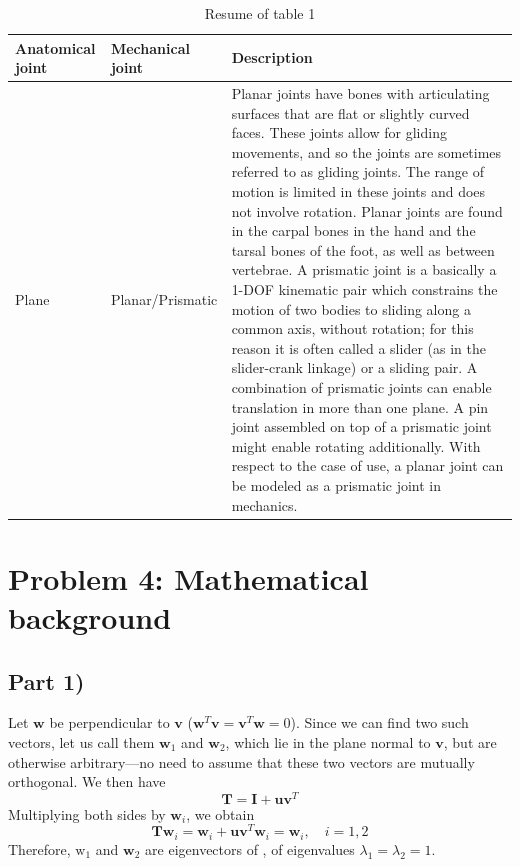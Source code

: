 \documentclass[conference]{IEEEtran}
\begin{document}
{\begin{table}[htbp]
    \caption{Resume of table 1}
    \centering
    \begin{tabular}{|Y|Y|m{120px}|}
        \hline
        Anatomical joint & Mechanical joint & Description \\
        \hline
        Plane & Planar/Prismatic & Planar joints have bones with articulating surfaces that are flat or slightly curved faces. These joints allow for gliding movements, and so the joints are sometimes referred to as gliding joints. The range of motion is limited in these joints and does not involve rotation. Planar joints are found in the carpal bones in the hand and the tarsal bones of the foot, as well as between vertebrae. A prismatic joint is a basically a 1-DOF kinematic pair which constrains the motion of two bodies to sliding along a common axis, without rotation; for this reason it is often called a slider (as in the slider-crank linkage) or a sliding pair. A combination of prismatic joints can enable translation in more than one plane. A pin joint assembled on top of a prismatic joint might enable rotating additionally. With respect to the case of use, a planar joint can be modeled as a prismatic joint in mechanics.\\
        \hline
    \end{tabular}
    \label{tab:table_two}
\end{table}
}

\vspace{10px}
\section{Problem 4: Mathematical background}
\subsection*{Part 1)}
Let \( \mathbf{w} \) be perpendicular to \( \mathbf{v} \) (\( \mathbf{w}^T\mathbf{v} = \mathbf{v}^T\mathbf{w} = 0 \)). Since we can find two such vectors, let us call them \( \mathbf{w}_1 \) and \( \mathbf{w}_2 \), which lie in the plane normal to \( \mathbf{v} \), but are otherwise arbitrary—no need to assume that these two vectors are mutually orthogonal. We then have
\[
\mathbf{T} = \mathbf{I} + \mathbf{u}\mathbf{v}^T
\]
Multiplying both sides by \( \mathbf{w}_i \), we obtain
\[
\mathbf{T}\mathbf{w}_i = \mathbf{w}_i + \mathbf{u}\mathbf{v}^T\mathbf{w}_i = \mathbf{w}_i,  \quad i=1,2 
\]
Therefore, \( \text{w}_1 \) and \( \textbf{w}_2 \) are eigenvectors of , of eigenvalues \( \lambda_1 =  \lambda_2 = 1.\)
\end{document}
